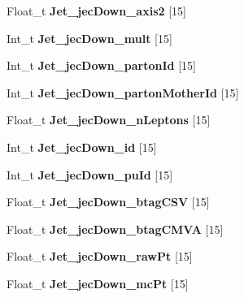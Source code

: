 \begin{DoxyCompactItemize}
\hypertarget{classMiniTree_a9906c79f832262701f3a15e43d272467}{}\label{classMiniTree_a9906c79f832262701f3a15e43d272467} 
Float\+\_\+t {\bfseries Jet\+\_\+jec\+Down\+\_\+axis2} \mbox{[}15\mbox{]}
\item 
\hypertarget{classMiniTree_a5bf711201d0ae732b0df897eba9b0822}{}\label{classMiniTree_a5bf711201d0ae732b0df897eba9b0822} 
Int\+\_\+t {\bfseries Jet\+\_\+jec\+Down\+\_\+mult} \mbox{[}15\mbox{]}
\item 
\hypertarget{classMiniTree_ad40911416eeeaa149b07c8477dc9081d}{}\label{classMiniTree_ad40911416eeeaa149b07c8477dc9081d} 
Int\+\_\+t {\bfseries Jet\+\_\+jec\+Down\+\_\+parton\+Id} \mbox{[}15\mbox{]}
\item 
\hypertarget{classMiniTree_ae95483ddcc8e83aa4bbff4cc8ce1bc77}{}\label{classMiniTree_ae95483ddcc8e83aa4bbff4cc8ce1bc77} 
Int\+\_\+t {\bfseries Jet\+\_\+jec\+Down\+\_\+parton\+Mother\+Id} \mbox{[}15\mbox{]}
\item 
\hypertarget{classMiniTree_a9cee8f9bc5ba426c37746c84a140d0e3}{}\label{classMiniTree_a9cee8f9bc5ba426c37746c84a140d0e3} 
Float\+\_\+t {\bfseries Jet\+\_\+jec\+Down\+\_\+n\+Leptons} \mbox{[}15\mbox{]}
\item 
\hypertarget{classMiniTree_a3e2a4fb562998abfb6a7bc098b694fbe}{}\label{classMiniTree_a3e2a4fb562998abfb6a7bc098b694fbe} 
Int\+\_\+t {\bfseries Jet\+\_\+jec\+Down\+\_\+id} \mbox{[}15\mbox{]}
\item 
\hypertarget{classMiniTree_ac0a0aae40dadcda7529eb9f8b138e0d0}{}\label{classMiniTree_ac0a0aae40dadcda7529eb9f8b138e0d0} 
Int\+\_\+t {\bfseries Jet\+\_\+jec\+Down\+\_\+pu\+Id} \mbox{[}15\mbox{]}
\item 
\hypertarget{classMiniTree_adb1060eb8c512693a52bae6a1ab1de42}{}\label{classMiniTree_adb1060eb8c512693a52bae6a1ab1de42} 
Float\+\_\+t {\bfseries Jet\+\_\+jec\+Down\+\_\+btag\+C\+SV} \mbox{[}15\mbox{]}
\item 
\hypertarget{classMiniTree_a914ac6c062bba6294904dbef7ff2e490}{}\label{classMiniTree_a914ac6c062bba6294904dbef7ff2e490} 
Float\+\_\+t {\bfseries Jet\+\_\+jec\+Down\+\_\+btag\+C\+M\+VA} \mbox{[}15\mbox{]}
\item 
\hypertarget{classMiniTree_ac48a8c0468f2910027882a21d10a2cfb}{}\label{classMiniTree_ac48a8c0468f2910027882a21d10a2cfb} 
Float\+\_\+t {\bfseries Jet\+\_\+jec\+Down\+\_\+raw\+Pt} \mbox{[}15\mbox{]}
\item 
\hypertarget{classMiniTree_aeab9d3c4e901236c1b2f2ba981e0bde7}{}\label{classMiniTree_aeab9d3c4e901236c1b2f2ba981e0bde7} 
Float\+\_\+t {\bfseries Jet\+\_\+jec\+Down\+\_\+mc\+Pt} \mbox{[}15\mbox{]}

\end{DoxyCompactItemize}
